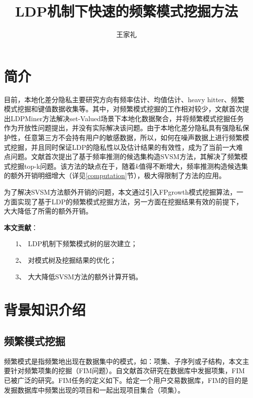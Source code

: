 \documentclass[UTF8,a4paper]{ctexart}
\title{LDP机制下快速的频繁模式挖掘方法}
\author{王家礼}
\begin{document}
\maketitle


\section{简介}
目前，本地化差分隐私主要研究方向有频率估计、均值估计、heavy hitter、频繁模式挖掘和键值数据收集等。其中，对频繁模式挖掘的工作相对较少，文献\cite{qin2016heavy}首次提出LDPMiner方法解决set-Valued场景下本地化数据聚合，并将频繁模式挖掘任务作为开放性问题提出，并没有实际解决该问题。由于本地化差分隐私具有强隐私保护性，任意第三方不会持有用户的敏感数据，所以，如何在噪声数据上进行频繁模式挖掘，并且同时保证LDP的隐私性以及估计结果的有效性，成为了当前一大难点问题。文献\cite{wang2018locally}首次提出了基于频率推测的候选集构造SVSM方法，其解决了频繁模式挖掘top-k问题。该方法的缺点在于，随着$k$值得不断增大，频率推测构造候选集的额外开销明细增大（详见\ref{computation}节），极大得限制了方法的应用。 

为了解决SVSM方法额外开销的问题，本文通过引入FPgrowth\cite{han2000mining}模式挖掘算法，一方面实现了基于LDP的频繁模式挖掘方法，另一方面在挖掘结果有效的前提下，大大降低了所需的额外开销。

\textbf{本文贡献}：
\begin{enumerate}
  \item[1、]LDP机制下频繁模式树的层次建立；
  \item[2、]对模式树及挖掘结果的优化；
  \item[3、]大大降低SVSM\cite{wang2018locally}方法的额外计算开销。
\end{enumerate}

\section{背景知识介绍}
  \subsection{频繁模式挖掘}

  频繁模式是指频繁地出现在数据集中的模式，如：项集、子序列或子结构，本文主要针对频繁项集的挖掘（FIM问题）。自文献\cite{agrawal1994fast}首次研究在数据库中发掘项集，FIM已被广泛的研究。FIM任务的定义如下。给定一个用户交易数据库，FIM的目的是发掘数据库中频繁出现的项目和一起出现项目集合（项集）。
\end{document}
